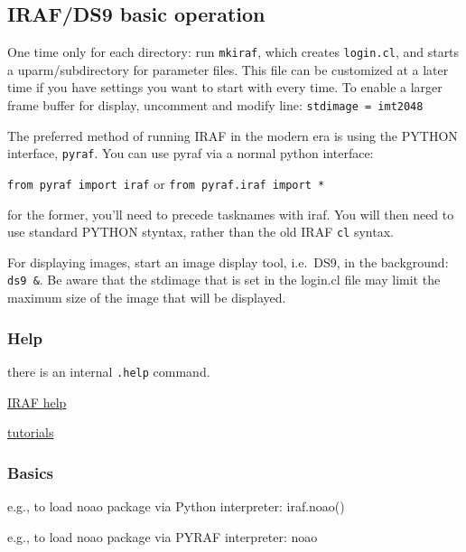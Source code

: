 \documentclass{article}
\begin{document}
\subsection*{IRAF/DS9 basic operation}
One time only for each directory:
run \texttt{mkiraf}, which creates \texttt{login.cl}, and starts a
uparm/subdirectory for parameter files.
This file can be customized at a later time if you have settings you want
to start with every time.
To enable a larger frame buffer for display, uncomment and
modify line: \texttt{stdimage = imt2048}

The preferred method of running IRAF in the modern era is using the
PYTHON interface, \texttt{pyraf}.
You can use pyraf via a normal python interface:

\texttt{from pyraf import iraf} or \texttt{from pyraf.iraf import *}

for the former, you'll need to precede tasknames with iraf.
You will then need to use standard PYTHON styntax, rather
than the old IRAF \texttt{cl} syntax.


For displaying images, start an image display tool, i.e.\ DS9,
in the background: \texttt{ds9 \&}. Be aware that the stdimage that is set
in the login.cl file may limit the maximum size of the image that will
be displayed.

\subsubsection*{Help}
\begin{itemize*}
    \item there is an internal \texttt{.help} command.
    \item \href{http://iraf.noao.edu/iraf-help.html}
        {IRAF help}
    \item \href{http://iraf.noao.edu/iraf/web/tutorials/tutorials.html}
        {tutorials}
\end{itemize*}

\subsubsection*{Basics}

\begin{itemize*}
    \item e.g., to load noao package via Python interpreter: iraf.noao()
    \item e.g., to load noao package via PYRAF interpreter: noao
\end{itemize*}
\end{document}
